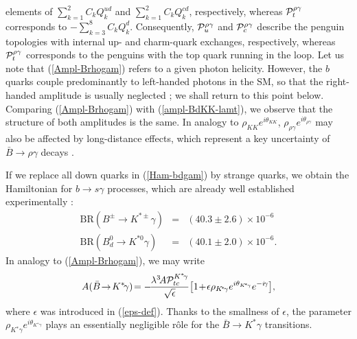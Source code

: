 \documentclass[11pt]{cernrep}
\begin{document}
elements of $\sum_{k=1}^{2}C_k Q_k^{ud}$ and $\sum_{k=1}^{2}C_k Q_k^{cd}$, 
respectively, whereas ${\cal P}_t^{\rho\gamma}$ corresponds to 
$-\sum_{k=3}^{8}C_k Q_k^{d}$. Consequently, ${\cal P}_u^{\rho\gamma}$
and ${\cal P}_c^{\rho\gamma}$ describe the penguin topologies with
internal up- and charm-quark exchanges, respectively, whereas 
${\cal P}_t^{\rho\gamma}$ corresponds to the penguins with the top
quark running in the loop. Let us note that 
(\ref{Ampl-Brhogam}) refers to a given photon helicity. However, 
the $b$ quarks couple predominantly to left-handed photons in 
the SM, so that the right-handed amplitude is usually neglected \cite{GP}; 
we shall return to this point below. Comparing (\ref{Ampl-Brhogam}) with 
(\ref{ampl-BdKK-lamt}), we observe that the structure of both amplitudes is 
the same. In analogy to $\rho_{K\!K} e^{i\theta_{K\!K}}$, 
$\rho_{\rho\gamma}e^{i\theta_{\rho\gamma}}$ may also be affected by 
long-distance effects, which represent a key uncertainty of 
$\bar B\to\rho\gamma$ decays \cite{LHC-Book,GP}. 

If we replace all down quarks in (\ref{Ham-bdgam}) by strange quarks, we obtain the 
Hamiltonian for $b\to s\gamma$ processes, which are already well established 
experimentally \cite{HFAG}:
\begin{eqnarray}
\mbox{BR}(B^\pm\to K^{\ast\pm}\gamma)&=&(40.3\pm2.6)\times 
10^{-6}\label{BR-charged}\\
\mbox{BR}(B_d^0\to K^{\ast0}\gamma)&=&(40.1\pm2.0)\times 
10^{-6}.\label{BR-neutral}
\end{eqnarray}
In analogy to (\ref{Ampl-Brhogam}), we may write
\begin{equation}\label{Ampl-BKastgam}
A(\bar B \!\to\! K^\ast \!\gamma)\!=-\!
\frac{\lambda^3 \! A {\cal P}_{tc}^{K^\ast\!\gamma}}{\sqrt{\epsilon}} \!
\left[1\!+\!\epsilon\rho_{K\!^\ast\!\gamma}e^{i\theta_{K\!^\ast\!\gamma}}
e^{-i\!\gamma}\right]\!,
\end{equation}
where $\epsilon$ was introduced in (\ref{eps-def}). Thanks to the smallness
of $\epsilon$, the parameter 
$\rho_{K\!^\ast\gamma}e^{i\theta_{K\!^\ast\gamma}}$ 
plays an essentially negligible r\^ole for the $\bar B \to K^\ast \gamma$ 
transitions.
\end{document}
